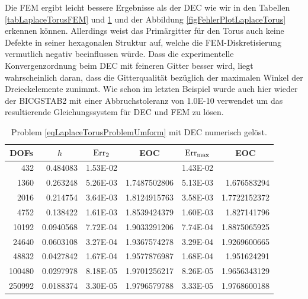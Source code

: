 \begin{beispiel}[Torus]
      Die FEM ergibt leicht bessere Ergebnisse als der DEC wie wir in den Tabellen \ref{tabLaplaceTorusFEM}
      und \ref{tabLaplaceTorusDEC} und der Abbildung \ref{figFehlerPlotLaplaceTorus} erkennen können.
      Allerdings weist das Primärgitter für den Torus auch keine Defekte in seiner hexagonalen Struktur
      auf, welche die FEM-Diskretisierung vermutlich negativ beeinflussen würde.
      Dass die experimentelle Konvergenzordnung beim DEC mit feineren Gitter besser wird, 
      liegt wahrscheinlich daran, dass die Gitterqualität bezüglich der maximalen Winkel der Dreieckelemente zunimmt.
      Wie schon im letzten Beispiel wurde auch hier wieder der BICGSTAB2 mit einer Abbruchstoleranz von
      1.0E-10 verwendet um das resultierende Gleichungssystem für DEC und FEM zu lösen.

       \begin{table}[htbp]
       \centering
       \begin{tabular}{|r|r|r|r|r|r|}
       \hline
       \multicolumn{1}{|c|}{DOFs} & \multicolumn{1}{c|}{\( h \)} & \multicolumn{1}{c|}{\( \text{Err}_{2} \)} & \multicolumn{1}{c|}{EOC} &
       \multicolumn{1}{c|}{ \( \text{Err}_{\max} \)} & \multicolumn{1}{c|}{EOC} \\ \hline
        432 & 0.484083 & 1.53E-02 & \multicolumn{1}{l|}{} & 1.43E-02 & \multicolumn{1}{l|}{} \\ \hline
        1360 & 0.263248 & 5.26E-03 & 1.7487502806 & 5.13E-03 & 1.676583294 \\ \hline
        2016 & 0.214754 & 3.64E-03 & 1.8124915763 & 3.58E-03 & 1.7722152372 \\ \hline
        4752 & 0.138422 & 1.61E-03 & 1.8539424379 & 1.60E-03 & 1.827141796 \\ \hline
        10192 & 0.0940568 & 7.72E-04 & 1.9033291206 & 7.74E-04 & 1.8875065925 \\ \hline
        24640 & 0.0603108 & 3.27E-04 & 1.9367574278 & 3.29E-04 & 1.9269600665 \\ \hline
        48832 & 0.0427842 & 1.67E-04 & 1.9577876987 & 1.68E-04 & 1.951624291 \\ \hline
        100480 & 0.0297978 & 8.18E-05 & 1.9701256217 & 8.26E-05 & 1.9656343129 \\ \hline
        250992 & 0.0188374 & 3.30E-05 & 1.9796579788 & 3.33E-05 & 1.9768600188 \\ \hline
       \end{tabular}
       \caption[Laplace auf Torus (DEC)]{Problem \eqref{eqLaplaceTorusProblemUmform} mit DEC numerisch gelöst.}
       \label{tabLaplaceTorusDEC}
       \end{table}
       

\end{beispiel}
